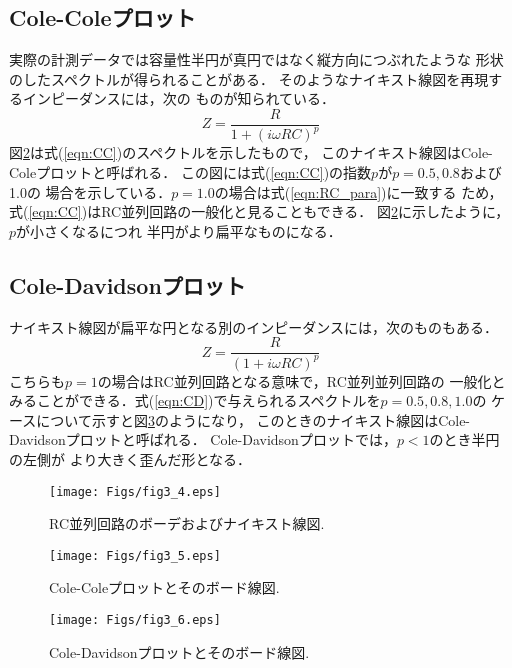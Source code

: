 \subsection{Cole-Coleプロット}
実際の計測データでは容量性半円が真円ではなく縦方向につぶれたような
形状のしたスペクトルが得られることがある．
そのようなナイキスト線図を再現するインピーダンスには，次の
ものが知られている．
\begin{equation}
	Z =\frac{R}{1+\left(i\omega RC\right)^p}
	\label{eqn:CC}
\end{equation}
図\ref{fig:fig3_5}は式(\ref{eqn:CC})のスペクトルを示したもので，
このナイキスト線図はCole-Coleプロットと呼ばれる．
この図には式(\ref{eqn:CC})の指数$p$が$p=0.5,0.8$および1.0の
場合を示している．$p=1.0$の場合は式(\ref{eqn:RC_para})に一致する
ため，式(\ref{eqn:CC})はRC並列回路の一般化と見ることもできる．
図\ref{fig:fig3_5}に示したように，$p$が小さくなるにつれ
半円がより扁平なものになる．
\subsection{Cole-Davidsonプロット}
ナイキスト線図が扁平な円となる別のインピーダンスには，次のものもある．
\begin{equation}
	Z =\frac{R}{\left(1+i\omega RC\right)^p}
	\label{eqn:CD}
\end{equation}
こちらも$p=1$の場合はRC並列回路となる意味で，RC並列並列回路の
一般化とみることができる．式(\ref{eqn:CD})で与えられるスペクトルを$p=0.5,0.8,1.0$の
ケースについて示すと図\ref{fig:fig3_6}のようになり，
このときのナイキスト線図はCole-Davidsonプロットと呼ばれる．
Cole-Davidsonプロットでは，$p<1$のとき半円の左側が
より大きく歪んだ形となる．
\begin{figure}[h]
	\begin{center}
	\texttt{[image: Figs/fig3\_4.eps]} 
	\end{center}
	\caption{
		RC並列回路のボーデおよびナイキスト線図.
	} 
	\label{fig:fig3_4}
\end{figure}
\begin{figure}[h]
	\begin{center}
	\texttt{[image: Figs/fig3\_5.eps]} 
	\end{center}
	\caption{
		Cole-Coleプロットとそのボード線図.
	} 
	\label{fig:fig3_5}
\end{figure}
\begin{figure}[h]
	\begin{center}
	\texttt{[image: Figs/fig3\_6.eps]} 
	\end{center}
	\caption{
		Cole-Davidsonプロットとそのボード線図.
	} 
	\label{fig:fig3_6}
\end{figure}
